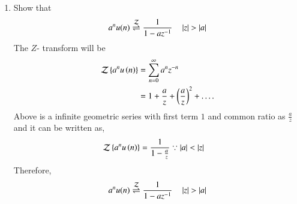 \documentclass[journal,12pt,twocolumn]{IEEEtran}
\renewcommand\thesection{\arabic{section}}
\begin{document}
\begin{enumerate}[label=\thesection.\arabic*]
    \item Show that 
      \begin{equation}
        \label{eq:anun}
        a^nu(n) \overset{\mathcal{Z}}{ \rightleftharpoons} \frac{1}{1-az^{-1}} \quad \left\vert z\right\vert > \left\vert a\right\vert
      \end{equation}
    \solution
     The $Z$- transform will be 
      \begin{align}
              \mathcal{Z}\left\{a^nu\left(n\right)\right\} &= \sum_{n = 0}^{\infty}a^{n}z^{-n}\\
                                              &= 1 + \frac{a}{z} + \left(\frac{a}{z}\right)^2 + .\,.\,.\,.
      \end{align}
     Above is a infinite geometric series with first term $1$ and common ratio as $\frac{a}{z}$ and it can 
       be written as,
      \begin{align}
              \mathcal{Z}\left\{a^nu\left(n\right)\right\} &= \frac{1}{1 - \frac{a}{z}} \because \left\vert a\right\vert < \left\vert z\right\vert 
      \end{align}
     Therefore,
      \begin{equation}
          a^nu(n) \overset{\mathcal{Z}}{ \rightleftharpoons} \frac{1}{1-az^{-1}} \quad \left\vert z\right\vert > \left\vert a\right\vert
      \end{equation}


\end{enumerate}
\end{document}
